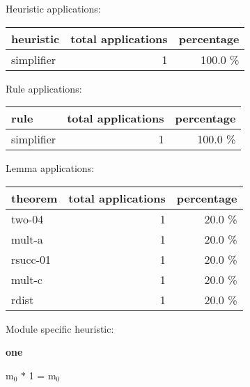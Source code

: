 \documentclass[a4paper]{article}
\begin{document}
\medskip


Heuristic applications:

\begin{supertabular}{l|r|r}
heuristic	& total applications & percentage \\ \hline
simplifier & 1 & 100.0 \% \\

\end{supertabular}

Rule applications:

\begin{supertabular}{l|r|r}
rule	        & total applications & percentage \\ \hline
simplifier & 1 & 100.0 \% \\

\end{supertabular}

Lemma applications:

\begin{supertabular}{l|r|r}
theorem	        & total applications & percentage \\ \hline
two-04 & 1 & 20.0 \% \\
mult-a & 1 & 20.0 \% \\
rsucc-01 & 1 & 20.0 \% \\
mult-c & 1 & 20.0 \% \\
rdist & 1 & 20.0 \% \\

\end{supertabular}

Module specific heuristic:

\pagebreak

{\LARGE\bf one}\label{lemma-one}

\medskip

 \Fol $\mbox{m}_{0}$ $*$ 1 = $\mbox{m}_{0}$
\end{document}
